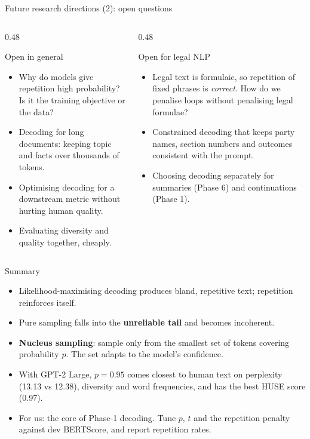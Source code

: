 \documentclass[aspectratio=169,11pt]{beamer}
\begin{document}
\begin{frame}{Future research directions (2): open questions}
  \begin{columns}[T]
    \begin{column}{0.48\textwidth}
      \begin{block}{Open in general}
        \small
        \begin{itemize}
          \item Why do models give repetition high probability? Is it the training objective or the data?
          \item Decoding for long documents: keeping topic and facts over thousands of tokens.
          \item Optimising decoding for a downstream metric without hurting human quality.
          \item Evaluating diversity and quality together, cheaply.
        \end{itemize}
      \end{block}
    \end{column}
    \begin{column}{0.48\textwidth}
      \begin{exampleblock}{Open for legal NLP}
        \small
        \begin{itemize}
          \item Legal text is formulaic, so repetition of fixed phrases is \emph{correct}. How do we penalise loops without penalising legal formulae?
          \item Constrained decoding that keeps party names, section numbers and outcomes consistent with the prompt.
          \item Choosing decoding separately for summaries (Phase 6) and continuations (Phase 1).
        \end{itemize}
      \end{exampleblock}
    \end{column}
  \end{columns}
\end{frame}

\begin{frame}{Summary}
  \begin{itemize}
    \item Likelihood-maximising decoding produces bland, repetitive text; repetition reinforces itself.
    \item Pure sampling falls into the \textbf{unreliable tail} and becomes incoherent.
    \item \textbf{Nucleus sampling}: sample only from the smallest set of tokens covering probability $p$. The set adapts to the model's confidence.
    \item With GPT-2 Large, $p=0.95$ comes closest to human text on perplexity (13.13 vs 12.38), diversity and word frequencies, and has the best HUSE score (0.97).
    \item For us: the core of Phase-1 decoding. Tune $p$, $t$ and the repetition penalty against dev BERTScore, and report repetition rates.
  \end{itemize}
\end{frame}
\end{document}
